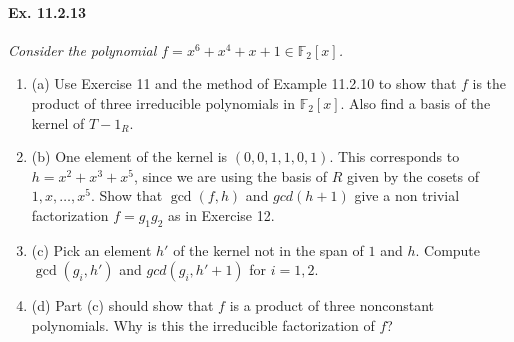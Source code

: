 \documentclass[11pt,a4paper]{article}
\newcommand{\be} {\begin{enumerate}}
\newcommand{\ee} {\end{enumerate}}
\newcommand{\F}{\mathbb{F}}
\begin{document}
\paragraph{Ex. 11.2.13}

{\it Consider the polynomial $f = x^6+x^4+x+1 \in \F_2[x]$.

\be
\item[(a)] Use Exercise 11 and the method of Example 11.2.10 to show that $f$ is the product of three irreducible polynomials in $\F_2[x]$. Also find a basis of the kernel of $T-1_R$.

\item[(b)] One element of the kernel is $(0,0,1,1,0,1)$. This corresponds to $h=x^2+x^3+x^5$, since we are using the basis of $R$ given by the cosets of $1,x,\ldots,x^5$. Show that $\gcd(f,h)$ and $gcd(h+1)$ give a non trivial factorization $f=g_1g_2$ as in Exercise 12.

\item[(c)] Pick an element $h'$ of the kernel not in the span of $1$ and $h$. Compute $\gcd(g_i,h')$ and $gcd(g_i,h'+1)$ for $i=1,2$.

\item[(d)] Part (c) should show that $f$ is a product of three nonconstant polynomials. Why is this the irreducible factorization of $f$?
\ee
}
\end{document}
